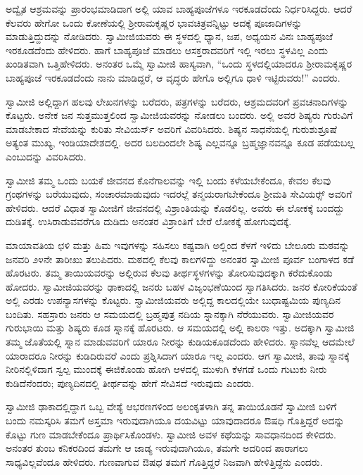 \newpage

 ಅದ್ವೈತ ಆಶ್ರಮವನ್ನು ಪ್ರಾರಂಭಮಾಡಿದಾಗ ಅಲ್ಲಿ ಯಾವ ಬಾಹ್ಯಪೂಜೆಗಳೂ ಇರಕೂಡದೆಂದು ನಿರ್ಧರಿಸಿದ್ದರು. ಆದರೆ ಕೆಲವರು ಹೇಗೋ ಒಂದು ಕೋಣೆಯಲ್ಲಿ ಶ‍್ರೀರಾಮಕೃಷ್ಣರ ಭಾವಚಿತ್ರವನ್ನಿಟ್ಟು ಅದಕ್ಕೆ ಪೂಜಾದಿಗಳನ್ನು ಮಾಡುತ್ತಿದ್ದುದನ್ನು ನೋಡಿದರು. ಸ್ವಾಮೀಜಿಯವರು ಈ ಸ್ಥಳದಲ್ಲಿ ಧ್ಯಾನ, ಜಪ, ಅಧ್ಯಯನ ವಿನಃ ಬಾಹ್ಯಪೂಜೆ ಇರಕೂಡದೆಂದು ಹೇಳಿದರು. ಹಾಗೆ ಬಾಹ್ಯಪೂಜೆ ಮಾಡಲು ಆಸಕ್ತರಾದವರಿಗೆ ಇಲ್ಲಿ ಇರಲು ಸ್ಥಳವಿಲ್ಲ ಎಂದು ಖಂಡಿತವಾಗಿ ಒತ್ತಿಹೇಳಿದರು. ಅನಂತರ ಒಮ್ಮೆ ಸ್ವಾಮೀಜಿ ಹಾಸ್ಯವಾಗಿ, “ಒಂದು ಸ್ಥಳದಲ್ಲಿಯಾದರೂ ಶ‍್ರೀರಾಮಕೃಷ್ಣರ ಬಾಹ್ಯಪೂಜೆ ಇರಕೂಡದೆಂದು ನಾನು ಮಾಡಿದ್ದರೆ, ಆ ವೃದ್ಧರು ಹೇಗೊ ಅಲ್ಲಿಗೂ ಧಾಳಿ ಇಟ್ಟಿರುವರು!” ಎಂದರು. 

 ಸ್ವಾಮೀಜಿ ಅಲ್ಲಿದ್ದಾಗ ಹಲವು ಲೇಖನಗಳನ್ನು ಬರೆದರು, ಪತ್ರಗಳನ್ನು ಬರೆದರು, ಆಶ್ರಮದವರಿಗೆ ಪ್ರವಚನಾದಿಗಳನ್ನು ಕೊಟ್ಟರು. ಅನೇಕ ಜನ ಸುತ್ತಮುತ್ತಲಿಂದ ಸ್ವಾಮೀಜಿಯವರನ್ನು ನೋಡಲು ಬಂದರು. ಅಲ್ಲಿ ಅವರ ಶಿಷ್ಯರು ಗುರುವಿಗೆ ಮಾಡಬೇಕಾದ ಸೇವೆಯನ್ನು ಕುರಿತು ಸೇವಿಯರ್ಸ್ ಅವರಿಗೆ ವಿವರಿಸಿದರು. ಶಿಷ್ಯನ ಸಾಧನೆಯಲ್ಲಿ ಗುರುಶುಶ್ರೂಷೆ ಅತ್ಯಂತ ಮುಖ್ಯ, ಇಂಡಿಯಾದೇಶದಲ್ಲಿ. ಅದರ ಬಲದಿಂದಲೇ ಶಿಷ್ಯ ಎಲ್ಲವನ್ನೂ ಬ್ರಹ್ಮಜ್ಞಾನವನ್ನೂ ಕೂಡ ಪಡೆಯಬಲ್ಲ ಎಂಬುದನ್ನು ವಿವರಿಸಿದರು. 

 ಸ್ವಾಮೀಜಿ ತಮ್ಮ ಒಂದು ಬಯಕೆ ಜೀವನದ ಕೊನೆಗಾಲವನ್ನು ಇಲ್ಲಿ ಬಂದು ಕಳೆಯಬೇಕೆಂದೂ, ಕೇವಲ ಕೆಲವು ಗ್ರಂಥಗಳನ್ನು ಬರೆಯುವುದು, ಸಂಚಾರಮಾಡುವುದು ಇದರಲ್ಲೆ ತನ್ಮಯರಾಗಬೇಕೆಂದೂ ಶ‍್ರೀಮತಿ ಸೇವಿಯರ್ಸ್‍‍ ಅವರಿಗೆ ಹೇಳಿದರು. ಆದರೆ ವಿಧಾತ ಸ್ವಾಮೀಜಿಗೆ ಜೀವನದಲ್ಲಿ ವಿಶ್ರಾಂತಿಯನ್ನು ಕೊಡಲಿಲ್ಲ. ಅವರು ಈ ಲೋಕಕ್ಕೆ ಬಂದದ್ದು ದುಡಿತಕ್ಕೆ. ಉಸಿರಾಡುವವರೆಗೂ ದುಡಿದು ಅನಂತರ ವಿಶ್ರಾಂತಿಗೆ ಬೇರೆ ಲೋಕಕ್ಕೆ ಹೋಗುವುದಕ್ಕೆ. 

 ಮಾಯಾವತಿಯ ಛಳಿ ಮತ್ತು ಹಿಮ ಇವುಗಳನ್ನು ಸಹಿಸಲು ಕಷ್ಟವಾಗಿ ಅಲ್ಲಿಂದ ಕೆಳಗೆ ಇಳಿದು ಬೇಲೂರು ಮಠವನ್ನು ಜನವರಿ ೨೪ನೇ ತಾರೀಖು ತಲುಪಿದರು. ಮಠದಲ್ಲಿ ಕೆಲವು ಕಾಲಗಳಿದ್ದು ಅನಂತರ ಸ್ವಾಮೀಜಿ ಪೂರ್ವ ಬಂಗಾಳದ ಕಡೆ ಹೊರಟರು. ತಮ್ಮ ತಾಯಿಯವರನ್ನು ಅಲ್ಲಿರುವ ಕೆಲವು ತೀರ್ಥಸ್ಥಳಗಳನ್ನು ತೋರಿಸುವುದಕ್ಕಾಗಿ ಕರೆದುಕೊಂಡು ಹೋದರು. ಸ್ವಾಮೀಜಿಯವರನ್ನು ಢಾಕಾದಲ್ಲಿ ಜನರು ಬಹಳ ವಿಜೃಂಭಣೆಯಿಂದ ಸ್ವಾಗತಿಸಿದರು. ಜನರ ಕೋರಿಕೆಯಂತೆ ಅಲ್ಲಿ ಎರಡು ಉಪನ್ಯಾಸಗಳನ್ನು ಕೊಟ್ಟರು. ಸ್ವಾಮೀಜಿಯವರು ಅಲ್ಲಿದ್ದ ಕಾಲದಲ್ಲಿಯೇ ಬುಧಾಷ್ಟಮಿಯ ಪುಣ್ಯದಿನ ಬಂದಿತು. ಸಹಸ್ರಾರು ಜನರು ಆ ಸಮಯದಲ್ಲಿ ಬ್ರಹ್ಮಪುತ್ರ ನದಿಯ ಸ್ನಾನಕ್ಕಾಗಿ ನೆರೆಯುವರು. ಸ್ವಾಮೀಜಿಯವರ ಗುರುಭಾಯಿ ಮತ್ತು ಶಿಷ್ಯರು ಕೂಡ ಸ್ನಾನಕ್ಕೆ ಹೊರಟರು. ಆ ಸಮಯದಲ್ಲಿ ಅಲ್ಲಿ ಕಾಲರಾ ಇತ್ತು. ಅದಕ್ಕಾಗಿ ಸ್ವಾಮೀಜಿ ತಮ್ಮ ಜೊತೆಯಲ್ಲಿ ಸ್ನಾನ ಮಾಡುವವರಿಗೆ ಯಾರೂ ನೀರನ್ನು ಕುಡಿಯಕೂಡದೆಂದು ಹೇಳಿದರು. ಸ್ನಾನವೆಲ್ಲ ಆದಮೇಲೆ ಯಾರಾದರೂ ನೀರನ್ನು ಕುಡಿದಿರುವರೆ ಎಂದು ಪ್ರಶ್ನಿಸಿದಾಗ ಯಾರೂ ಇಲ್ಲ ಎಂದರು. ಆಗ ಸ್ವಾಮೀಜಿ, ತಾವು ಸ್ನಾನಕ್ಕೆ ನೀರಿನಲ್ಲಿಳಿದಾಗ ಸ್ವಲ್ಪ ಮುಂದಕ್ಕೆ ಈಜಿಕೊಂಡು ಹೋಗಿ ಆಳದಲ್ಲಿ ಮುಳುಗಿ ಕೆಳಗಡೆ ಒಂದು ಗುಟುಕು ನೀರು ಕುಡಿದೆನೆಂದರು; ಪುಣ್ಯದಿನದಲ್ಲಿ ತೀರ್ಥವನ್ನು ಹೇಗೆ ಸೇವಿಸದೆ ಇರುವುದು ಎಂದರು. 

 ಸ್ವಾಮೀಜಿ ಢಾಕಾದಲ್ಲಿದ್ದಾಗ ಒಬ್ಬ ವೇಶ್ಯೆ ಆಭರಣಗಳಿಂದ ಅಲಂಕೃತಳಾಗಿ ತನ್ನ ತಾಯಿಯೊಡನೆ ಸ್ವಾಮೀಜಿ ಬಳಿಗೆ ಬಂದು ನಮಸ್ಕರಿಸಿ ತಮಗೆ ಅಸ್ತಮಾ ಇರುವುದಾಗಿಯೂ ದಯವಿಟ್ಟು ಯಾವುದಾದರೂ ಔಷಧಿ ಗೊತ್ತಿದ್ದರೆ ಅದನ್ನು ಕೊಟ್ಟು ಗುಣ ಮಾಡಬೇಕೆಂದೂ‌ ಪ್ರಾರ್ಥಿಸಿಕೊಂಡಳು. ಸ್ವಾಮೀಜಿ ಅವಳ ಕಥೆಯನ್ನು ಸಾವಧಾನದಿಂದ ಕೇಳಿದರು. ಅನಂತರ ತುಂಬ ಕನಿಕರದಿಂದ ತಮಗೇ ಆ ಜಾಡ್ಯ ಇರುವುದಾಗಿಯೂ, ತಮಗೇ ಅದರಿಂದ ಪಾರಾಗಲು ಸಾಧ್ಯವಿಲ್ಲವೆಂದೂ ಹೇಳಿದರು. ಗುಣವಾಗುವ ಔಷಧ ತಮಗೆ ಗೊತ್ತಿದ್ದರೆ ನಿಜವಾಗಿ ಹೇಳಿತ್ತಿದ್ದೆನು ಎಂದರು. 

